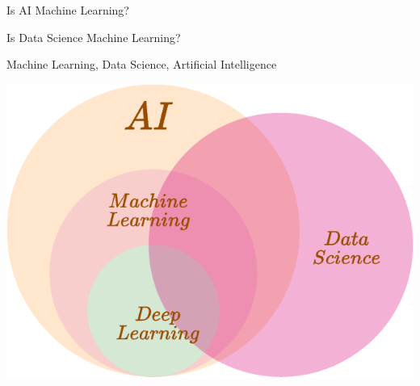 \documentclass[aspectratio=169,xcolor=dvipsnames,svgnames,x11names,fleqn]{beamer}
\begin{document}
\begin{frame}{}

\begin{center}

\Huge

\color{darkEmerald}

Is AI Machine Learning?

\end{center}

\end{frame}


\begin{frame}{}

\begin{center}

\Huge

\color{darkEmerald}

Is Data Science Machine Learning?

\end{center}

\end{frame}

\begin{frame}{Machine Learning, Data Science, Artificial Intelligence}
\begin{center}
\includegraphics[height=.7\textheight]{figures/DI_ML_DL_DS.drawio.pdf}
\end{center}
\end{frame}
\end{document}

